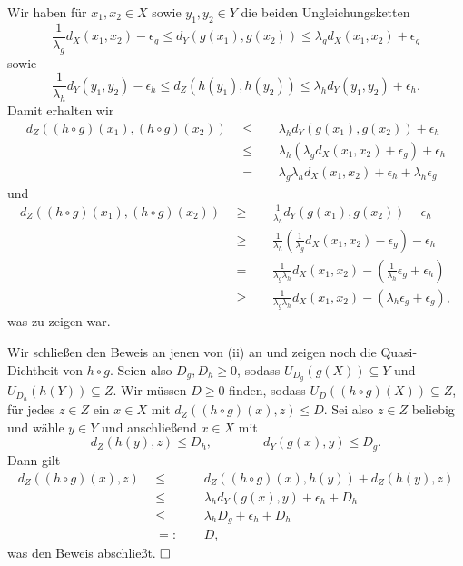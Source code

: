 \documentclass[11pt]{book}
\numberwithin{dummy}{section}
\theoremstyle{nonumberbreak}
\newenvironment{prob}[1][]{\ifthenelse{\equal{#1}{}}{\problem}{\problem[#1]}\rm}{\endproblem}
\newenvironment{sol}[1][]{\ifthenelse{\equal{#1}{}}{\solution}{\solution[#1]}\rm}{\endsolution}
\begin{document}
\begin{spacing}{1.4}
\begin{prob}
\begin{sol}
\begin{compactenum}
\item Wir haben für $x_1,x_2 \in X$ sowie $y_1,y_2\in Y$ die beiden Ungleichungsketten
$$\frac{1}{\lambda_g} d_X(x_1,x_2) - \epsilon_g \leqslant d_Y(g(x_1), g(x_2)) \leqslant \lambda_g d_X(x_1,x_2) + \epsilon_g$$
sowie 
$$\frac{1}{\lambda_h} d_Y(y_1,y_2) - \epsilon_h \leqslant d_Z(h(y_1), h(y_2)) \leqslant \lambda_h d_Y(y_1,y_2) + \epsilon_h.$$
Damit erhalten wir 
\begin{alignat*}{5}
d_Z\left((h\circ g)(x_1), (h\circ g)(x_2)\right) \ \ &\leqslant&& \ \ \lambda_h d_Y(g(x_1),g(x_2)) + \epsilon_h\\
&\leqslant&& \ \ \lambda_h\left( \lambda_g d_X(x_1,x_2) + \epsilon_g\right) + \epsilon_h\\
&=&& \ \ \lambda_g\lambda_h d_X(x_1,x_2) + \epsilon_h+\lambda_h\epsilon_g
\end{alignat*}
und
\begin{alignat*}{5}
d_Z\left((h\circ g)(x_1), (h\circ g)(x_2)\right) \ \ &\geqslant&& \ \ \frac{1}{\lambda_h} d_Y\left(g(x_1),g(x_2)\right) - \epsilon_h \\
&\geqslant&& \ \ \frac{1}{\lambda_h} \left( \frac{1}{\lambda_g} d_X(x_1,x_2) - \epsilon_g\right) - \epsilon_h \\
&=&&\ \ \frac{1}{\lambda_g\lambda_h} d_X(x_1,x_2) - \left(\frac{1}{\lambda_h} \epsilon_g + \epsilon_h\right) \\
&\geqslant&& \ \ \frac{1}{\lambda_g \lambda_h} d_X(x_1,x_2) - \left(\lambda_h \epsilon_g + \epsilon_g\right),
\end{alignat*}
was zu zeigen war.

\item Wir schließen den Beweis an jenen von (ii) an und zeigen noch die Quasi-Dichtheit von $h\circ g$. Seien also $D_g, D_h\geqslant 0$, sodass $U_{D_g}(g(X))\subseteq Y$ und $U_{D_h}(h(Y))\subseteq Z$. Wir müssen $D\geqslant 0$ finden, sodass $U_D((h\circ g)(X))\subseteq Z$, für jedes $z \in Z$ ein $x \in X$ mit $d_Z((h \circ g)(x),z)\leqslant D$. Sei also $z \in Z$ beliebig und wähle $y \in Y$ und anschließend $x \in X$ mit 
$$d_Z(h(y),z) \leqslant D_h, \qquad \qquad d_Y(g(x),y)\leqslant D_g.$$
Dann gilt 
\begin{alignat*}{5}
d_Z((h \circ g)(x),z)\ \ &\leqslant&& \ \ d_Z((h \circ g)(x), h(y)) + d_Z(h(y),z) \\
&\leqslant&& \ \ \lambda_h d_Y(g(x),y) +\epsilon_h + D_h \\
&\leqslant&& \ \ \lambda_h D_g + \epsilon_h + D_h\\
&=:&& \ \ D,
\end{alignat*}
was den Beweis abschließt. $\hfill \Box$



\end{compactenum}
\end{sol}
\end{prob}
\end{spacing}
\end{document}
